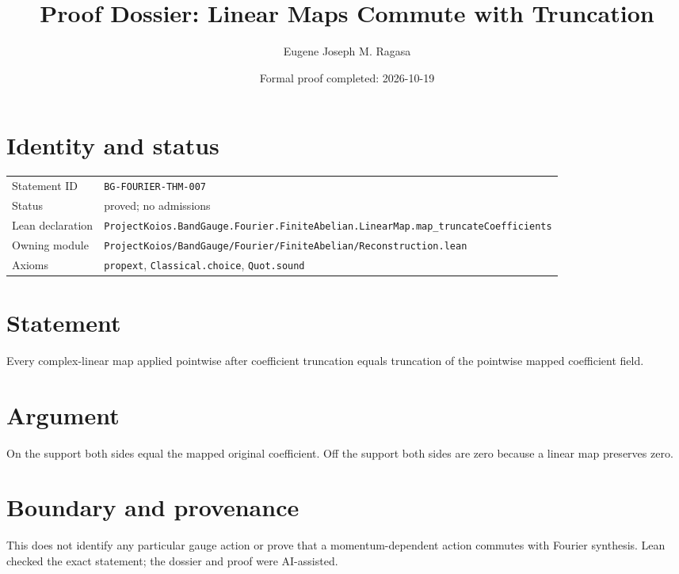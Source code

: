 \documentclass[11pt]{article}
\title{Proof Dossier: Linear Maps Commute with Truncation}
\author{Eugene Joseph M. Ragasa}
\date{Formal proof completed: 2026-10-19}
\begin{document}
\maketitle
\section{Identity and status}
\begin{tabularx}{\textwidth}{@{}lX@{}}\toprule
Statement ID & \texttt{BG-FOURIER-THM-007} \\
Status & proved; no admissions \\
Lean declaration & \texttt{ProjectKoios.BandGauge.Fourier.FiniteAbelian.LinearMap.}\newline\texttt{map\_truncateCoefficients} \\
Owning module & \texttt{ProjectKoios/BandGauge/Fourier/FiniteAbelian/Reconstruction.lean} \\
Axioms & \texttt{propext}, \texttt{Classical.choice}, \texttt{Quot.sound} \\
\bottomrule\end{tabularx}
\section{Statement}
Every complex-linear map applied pointwise after coefficient truncation equals truncation of the pointwise mapped coefficient field.
\section{Argument}
On the support both sides equal the mapped original coefficient. Off the support both sides are zero because a linear map preserves zero.
\section{Boundary and provenance}
This does not identify any particular gauge action or prove that a momentum-dependent action commutes with Fourier synthesis. Lean checked the exact statement; the dossier and proof were AI-assisted.
\end{document}
